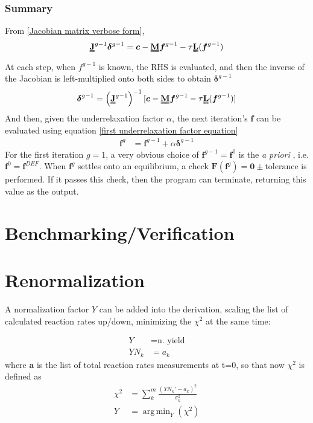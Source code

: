 \documentclass[a4paper, 12pt]{article}
\DeclareMathOperator*{\argmin}{arg\,min}
\newcommand{\matr}[1]{\uuline{\bf{#1}}}
\newcommand{\ve}[1]{\boldsymbol{#1}}
\newcommand{\apriori}[0]{\textit{a priori} }
\begin{document}
\subsubsection{Summary}
From \ref{Jacobian matrix verbose form},
\begin{equation}
    \matr{J}^{g-1} \ve{\delta}^{g-1} = \ve{c} - \matr{M} \ve{f}^{g-1} - \tau\matr{L}(\ve{f}^{g-1})
\end{equation}
At each step, when $f^{g-1}$ is known, the RHS is evaluated,
and then the inverse of the Jacobian is left-multiplied onto both sides to obtain $\ve{\delta}^{g-1}$
\begin{equation}
    \ve{\delta}^{g-1} = \left(\matr{J}^{g-1}\right)^{-1} [\ve{c} - \matr{M} \ve{f}^{g-1} - \tau\matr{L}(\ve{f}^{g-1})]
\end{equation}
And then, given the underrelaxation factor $\alpha$, the next iteration's $\ve{f}$ can be evaluated using equation \ref{first underrelaxation factor equation}
\begin{align}
    \ve{f}^g &= \ve{f}^{g-1} + \alpha \ve{\delta}^{g-1}
\end{align}
For the first iteration $g=1$, a very obvious choice of $\ve{f}^{g-1} = \ve{f}^{0}$ is the \apriori, i.e. $\ve{f}^0 = \ve{f}^{DEF}$.
When $\ve{f}^g$ settles onto an equilibrium, a check $\ve{F}(\ve{f}^g)=\ve{0}\pm\text{tolerance}$ is performed. If it passes this check, then the program can terminate, returning this value as the output.

\section{Benchmarking/Verification}
\clearpage

\section{Renormalization}
A normalization factor $Y$ can be added into the derivation, scaling the list of calculated reaction rates up/down, minimizing the $\chi^2$ at the same time:

\begin{align}
    Y&=\text{n. yield} \\
    Y N_k &= a_k
\end{align}    
where $\ve{a}$ is the list of total reaction rates measurements at t=0,
so that now $\chi^2$ is defined as
\begin{align}
    \chi^2 &= \sum_k^m\frac{(Y N_k' - a_k)^2}{\sigma_k^2}\\
    Y &= \argmin_{Y} (\chi^2) \label{argmin equation}
\end{align}
\end{document}
